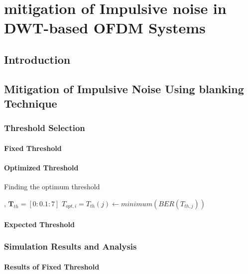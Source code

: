 \chapter{mitigation of Impulsive noise in DWT-based OFDM Systems} \label{chap5}
	\section{Introduction}

	\section{Mitigation of Impulsive Noise Using  blanking Technique} \label{sec5:NB}

		\subsection{Threshold Selection}
			\subsubsection{Fixed Threshold}
			\subsubsection{Optimized Threshold}

\begin{algorithm} 
\caption{Finding the optimum threshold }
\label{algo5:algo1}
\begin{algorithmic}
   , $ \textbf{T} _{th}=[0:0.1:7] $
    	\EndProcedure
    \EndFor
        \State $T_{opt,i}=T_{th}(j)\gets {minimum}(BER(T_{th,j}))$
    \EndFor 
  \EndProcedure
\end{algorithmic}
\end{algorithm}


		\subsubsection{Expected Threshold}
			
		\subsection{Simulation Results and Analysis}
				\subsubsection{Results of Fixed Threshold}	
